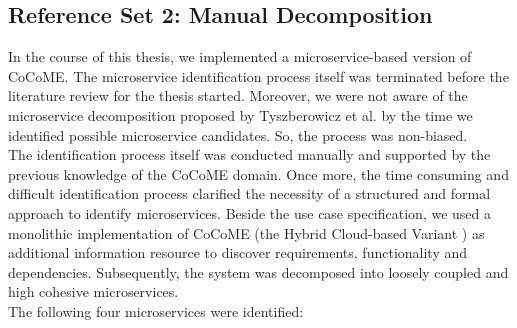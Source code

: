 \subsection{Reference Set 2: Manual Decomposition}
In the course of this thesis, we implemented a microservice-based version of CoCoME. The microservice identification process itself was terminated before the literature review for the thesis started. Moreover, we were not aware of the microservice decomposition proposed by Tyszberowicz et al. \cite{FunctionalDecompositionHeinrich} by the time we identified possible microservice candidates. So, the process was non-biased. \\
The identification process itself was conducted manually and supported by the previous knowledge of the CoCoME domain. Once more, the time consuming and difficult identification process clarified the necessity of a structured and formal approach to identify microservices. Beside the use case specification, we used a monolithic implementation of CoCoME (the Hybrid Cloud-based Variant \cite{CoCoMETechnical}) as additional information resource to discover requirements, functionality and dependencies. Subsequently, the system was decomposed into loosely coupled and high cohesive microservices. \\
The following four microservices were identified:




